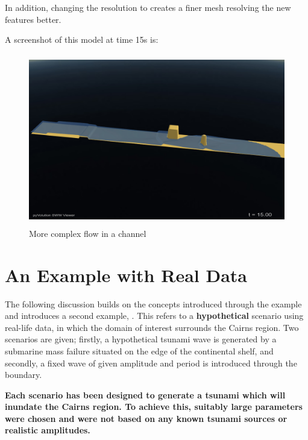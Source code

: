 \documentclass{manual}
\begin{document}
In addition, changing the resolution to  creates a finer mesh resolving the new features better.

A screenshot of this model at time 15s is:
\begin{figure}[htp]
  \centerline{\includegraphics[height=75mm]
    {graphics/channel3.png}}
  \caption{More complex flow in a channel}
  \label{fig:channel3}
\end{figure}


\chapter{An Example with Real Data}

\label{sec:realdataexample} The following discussion builds on the
concepts introduced through the  example and
introduces a second example, .  This refers to
a {\bf hypothetical} scenario using real-life data,
in which the domain of interest surrounds the
Cairns region. Two scenarios are given; firstly, a
hypothetical tsunami wave is generated by a submarine mass failure
situated on the edge of the continental shelf, and secondly, a fixed wave
of given amplitude and period is introduced through the boundary.

{\bf
Each scenario has been designed to generate a tsunami which will
inundate the Cairns region. To achieve this, suitably large
parameters were chosen and were not based on any known tsunami sources
or realistic amplitudes.
}
\end{document}
